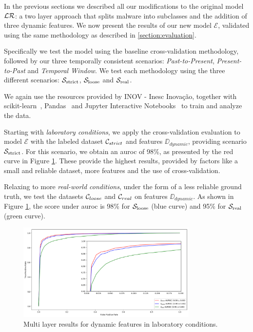 In the previous sections we described all our modifications to the original model $\mathcal{LR}$: a two layer approach that splits malware into subclasses and the addition of three dynamic features.
We now present the results of our new model $\mathcal{E}$, validated using the same methodology as described in \ref{section:evaluation}.

Specifically we test the model using the baseline cross-validation methodology, followed by our three temporally consistent scenarios: \textit{Past-to-Present}, \textit{Present-to-Past} and \textit{Temporal Window}.
We test each methodology using the three different scenarios: $\mathcal{S}_{\mathrm{strict}}$, $\mathcal{S}_{\mathrm{loose}}$ and $\mathcal{S}_{\mathrm{real}}$.

We again use the resources provided by INOV - Inesc Inovação, together with scikit-learn~\cite{tool:sklearn}, Pandas~\cite{tool:pandas} and Jupyter Interactive Notebooks~\cite{tool:jupyter} to train and analyze the data.

\medskip

Starting with \textit{laboratory conditions}, we apply the cross-validation evaluation to model $\mathcal{E}$ with the labeled dataset $\mathcal{C}_{strict}$ and features $\DD_{dynamic}$, providing scenario $\mathcal{S}_{\mathrm{strict}}$.
For this scenario, we obtain an \gls{auroc} of 98\%, as presented by the red curve in Figure \ref{fig:improved_xval}.
These provide the highest results, provided by factors like a small and reliable dataset, more features and the use of cross-validation.

Relaxing to more \textit{real-world conditions}, under the form of a less reliable ground truth, we test the datasets $\mathcal{C}_{loose}$ and $\mathcal{C}_{real}$ on features $\DD_{dynamic}$.
As shown in Figure \ref{fig:improved_xval}, the score under \gls{auroc} is 98\% for $\mathcal{S}_{\mathrm{loose}}$ (blue curve) and 95\% for $\mathcal{S}_{\mathrm{real}}$ (green curve).

\begin{figure}[!h]
	\centering
	\includegraphics[width=0.8\textwidth]{Figures/xval_improved.png}
	\caption{Multi layer results for dynamic features in laboratory conditions.}
	\label{fig:improved_xval}
\end{figure}

